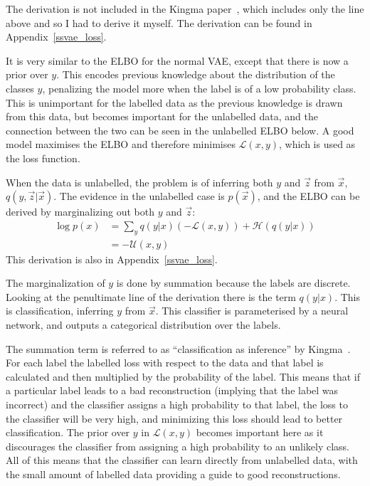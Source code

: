 The derivation is not included in the Kingma paper~\cite{DBLP:journals/corr/KingmaRMW14}, which includes only the line above and so I had 
to derive it myself. The derivation can be found in Appendix~\ref{ssvae_loss}.

It is very similar to the ELBO for the normal VAE, except that there is now a prior over $y$. This encodes previous knowledge about the 
distribution of the classes $y$, penalizing the model more when the label is of a low probability class. This is unimportant for the labelled
data as the previous knowledge is drawn from this data, but becomes important for the unlabelled data, and the connection between the two can be 
seen in the unlabelled ELBO below. A good model maximises the ELBO and therefore minimises $\mathcal{L}(x, y)$, which is used as the loss function.

When the data is unlabelled, the problem is of inferring both $y$ and $\vec{z}$ from $\vec{x}$, $q(y, \vec{z}|\vec{x})$. The evidence in the unlabelled 
case is $p(\vec{x})$,
and the ELBO can be derived by marginalizing out both $y$ and $\vec{z}$:
\begin{align}
  \log p(x) & = \sum_{y} q(y|x)(-\mathcal{L}(x, y)) + \mathcal{H}(q(y|x)) \\
  & = -\mathcal{U}(x, y)
\end{align}
This derivation is also in Appendix~\ref{ssvae_loss}.

The marginalization of $y$ is done by summation because the labels are discrete. Looking at the penultimate line of the derivation there is
the term $q(y|x)$. This is classification, inferring $y$ from $\vec{x}$. This classifier is parameterised
by a neural network, and outputs a categorical distribution over the labels.

The summation term is referred to as ``classification as inference'' by Kingma~\cite{DBLP:journals/corr/KingmaRMW14}. For each label the labelled loss with 
respect to the data and that label is calculated and then multiplied by the probability of the label. This means that if a particular label
leads to a bad reconstruction (implying that the label was incorrect) and the classifier assigns a high probability to that label, 
the loss to the classifier will be very high, and minimizing this loss should lead to better classification. The prior over $y$ in $\mathcal{L}(x, y)$
becomes important here as it discourages the classifier from assigning a high probability to an unlikely class. All of this means that 
the classifier can learn directly from unlabelled data, with the small amount of labelled data providing a guide to good reconstructions.

